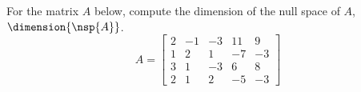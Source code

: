 For the matrix $A$ below, compute the dimension of the null space of $A$, $\dimension{\nsp{A}}$.
%
\begin{equation*}
A=
\begin{bmatrix}
 2 & -1 & -3 & 11 & 9 \\
 1 & 2 & 1 & -7 & -3 \\
 3 & 1 & -3 & 6 & 8 \\
 2 & 1 & 2 & -5 & -3
\end{bmatrix}
\end{equation*}